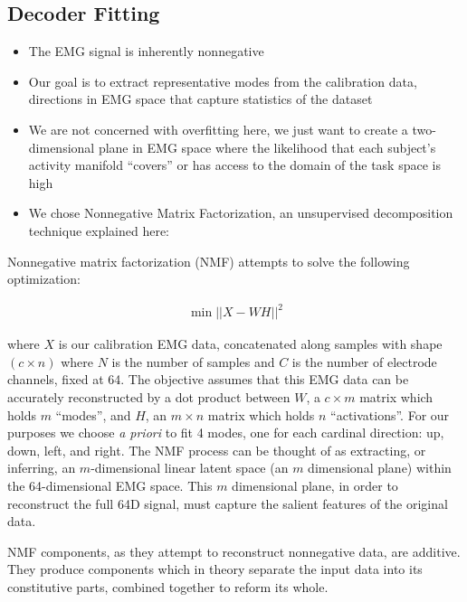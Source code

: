 \documentclass[../main.tex]{subfiles}
\begin{document}
\subsection{Decoder Fitting}\label{sec:decoder_fitting}


\begin{itemize}
  \item The EMG signal is inherently nonnegative
  \item Our goal is to extract representative modes from the calibration data, directions in EMG space that capture statistics of the dataset
  \item We are not concerned with overfitting here, we just want to create a two-dimensional plane in EMG space where the likelihood that each subject's activity manifold ``covers'' or has access to the domain of the task space is high
  \item We chose Nonnegative Matrix Factorization, an unsupervised decomposition technique explained here:
\end{itemize}

Nonnegative matrix factorization (NMF) attempts to solve the following optimization:

\begin{align}
  \min{||X - WH||^{2}}
\end{align}

where $X$ is our calibration EMG data, concatenated along samples with shape $(c\times{n})$ where $N$ is the number of samples and $C$ is the number of electrode channels, fixed at 64. The objective assumes that this EMG data can be accurately reconstructed by a dot product between $W$, a $c\times{m}$ matrix which holds $m$ ``modes'', and $H$, an $m\times{n}$ matrix which holds $n$ ``activations''. For our purposes we choose \textit{a priori} to fit 4 modes, one for each cardinal direction: up, down, left, and right. The NMF process can be thought of as extracting, or inferring, an $m$-dimensional linear latent space (an $m$ dimensional plane) within the 64-dimensional EMG space. This $m$ dimensional plane, in order to reconstruct the full 64D signal, must capture the salient features of the original data.

NMF components, as they attempt to reconstruct nonnegative data, are additive. They produce components which in theory separate the input data into its constitutive parts, combined together to reform its whole.
\end{document}
